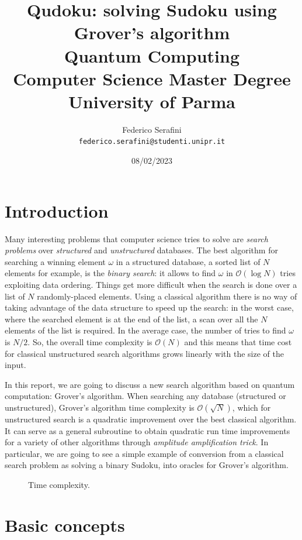 \documentclass{article}
\title
{
  Qudoku: solving Sudoku using Grover's algorithm \\
  \vspace*{1em}
  \large Quantum Computing\\
         Computer Science Master Degree\\
         University of Parma
}
\author{
  Federico Serafini\\
  \normalsize \texttt{federico.serafini@studenti.unipr.it}
}
\date{08/02/2023}
\begin{document}
\begin{titlepage}
  \clearpage\maketitle
  \thispagestyle{empty}
\end{titlepage}


\tableofcontents
\newpage

\section{Introduction}
Many interesting problems that computer science tries to solve are \emph{search
problems} over \emph{structured} and \emph{unstructured} databases.
The best algorithm for searching a winning element $\omega$ in a structured
database, a sorted list of $N$ elements for example, is the \emph{binary
search}: it allows to find $\omega$ in $\mathcal{O} (\log N)$ tries exploiting
data ordering.
Things get more difficult when the search is done over a list of $N$
randomly-placed elements.
Using a classical algorithm there is no way of taking advantage of
the data structure to speed up the search:
in the worst case, where the searched element is at the end of the list, a scan
over all the $N$ elements of the list is required.
In the average case, the number of tries to find $\omega$ is $N/2$.
So, the overall time complexity is $\mathcal{O}(N)$ and this means that time
cost for classical unstructured search algorithms grows linearly with the size
of the input.

In this report, we are going to discuss a new search
algorithm based on quantum computation: Grover's algorithm.
When searching any database (structured or unstructured), Grover's algorithm
time complexity is $\mathcal{O}(\sqrt N)$, which for unstructured
search is a quadratic improvement over the best classical algorithm.
It can serve as a general subroutine to
obtain quadratic run time improvements for a variety of other algorithms
through \emph{amplitude amplification trick}.
In particular, we are going to see a simple example of conversion from a
classical search problem as solving a binary Sudoku, into oracles for Grover's
algorithm.
\begin{figure}[H]
  \centering
  
  \caption{Time complexity.}
\end{figure}

\section{Basic concepts}
\end{document}
